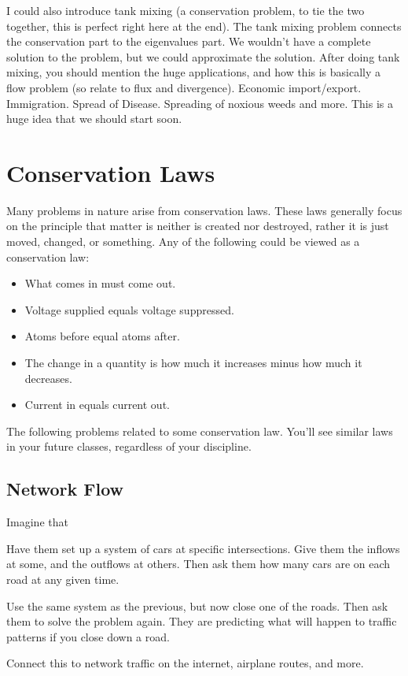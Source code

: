 I could also introduce tank mixing (a conservation problem, to tie the two together, this is perfect right here at the end).  The tank mixing problem connects the conservation part to the eigenvalues part.  We wouldn't have a complete solution to the problem, but we could approximate the solution. After doing tank mixing, you should mention the huge applications, and how this is basically a flow problem (so relate to flux and divergence).  Economic import/export.  Immigration. Spread of Disease. Spreading of noxious weeds and more.  This is a huge idea that we should start soon.




\section{Conservation Laws}
Many problems in nature arise from conservation laws.  These laws generally focus on the principle that matter is neither is created nor destroyed, rather it is just moved, changed, or something.  Any of the following could be viewed as a conservation law:
\begin{itemize}
 \item What comes in must come out.
 \item Voltage supplied equals voltage suppressed.
 \item Atoms before equal atoms after.
 \item The change in a quantity is how much it increases minus how much it decreases.
 \item Current in equals current out.
\end{itemize}
The following problems related to some conservation law.  You'll see similar laws in your future classes, regardless of your discipline.

\subsection{Network Flow}
Imagine that

\begin{problem}
Have them set up a system of cars at specific intersections.  Give them the inflows at some, and the outflows at others.  Then ask them how many cars are on each road at any given time. 
\end{problem}

\begin{problem}
 Use the same system as the previous, but now close one of the roads.  Then ask them to solve the problem again.  They are predicting what will happen to traffic patterns if you close down a road.
\end{problem}
Connect this to network traffic on the internet, airplane routes, and more.

